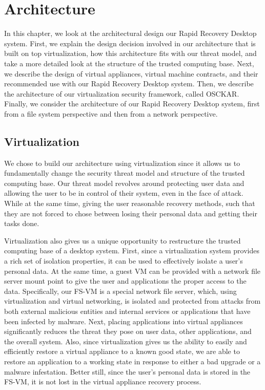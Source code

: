 
\chapter{Architecture}

In this chapter, we look at the architectural design our Rapid Recovery Desktop system. First, we explain the design decision involved in our architecture that is built on top virtualization, how this architecture fits with our threat model, and take a more detailed look at the structure of the trusted computing base. Next, we describe the design of virtual appliances, virtual machine contracts, and their recommended use with our Rapid Recovery Desktop system. Then, we describe the architecture of our virtualization security framework, called OSCKAR. Finally, we consider the architecture of our Rapid Recovery Desktop system, first from a file system perspective and then from a network perspective.

\section{Virtualization}

We chose to build our architecture using virtualization since it allows us to fundamentally change the security threat model and structure of the trusted computing base. Our threat model revolves around protecting user data and allowing the user to be in control of their system, even in the face of attack. While at the same time, giving the user reasonable recovery methods, such that they are not forced to chose between losing their personal data and getting their tasks done.

Virtualization also gives us a unique opportunity to restructure the trusted computing base of a desktop system. First, since a virtualization system provides a rich set of isolation properties, it can be used to effectively isolate a user's personal data. At the same time, a guest VM can be provided with a network file server mount point to give the user and applications the proper access to the data. Specifically, our FS-VM is a special network file server, which, using virtualization and virtual networking, is isolated and protected from attacks from both external malicious entities and internal services or applications that have been infected by malware. Next, placing applications into virtual appliances significantly reduces the threat they pose on user data, other applications, and the overall system. Also, since virtualization gives us the ability to easily and efficiently restore a virtual appliance to a known good state, we are able to restore an application to a working state in response to either a bad upgrade or a malware infestation. Better still, since the user's personal data is stored in the FS-VM, it is not lost in the virtual appliance recovery process.


